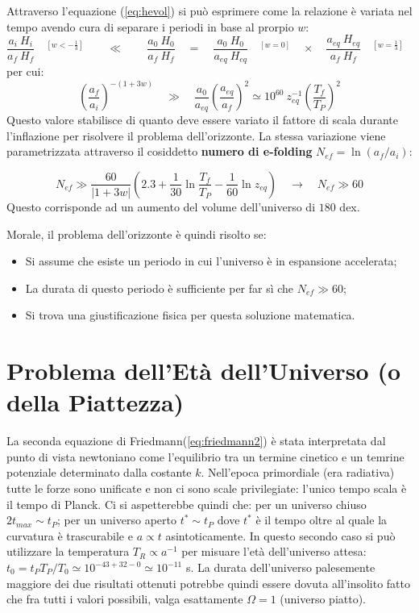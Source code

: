Attraverso l'equazione (\ref{eq:hevol}) si può esprimere come la relazione è variata nel tempo avendo cura di separare i periodi in base al prorpio $w$:
\begin{equation*}
\frac{a_i ~H_i}{a_f ~H_f}\quad ^{[w<- \frac{1}{3}]} \qquad\ll\qquad \frac{a_0 ~H_0}{a_f ~H_f}\quad = \quad\frac{a_0 ~H_0}{a_{eq} ~H_{eq}} \quad ^{[w=0]}\quad \times \quad\frac{a_{eq} ~H_{eq}}{a_f ~H_f} \quad ^{[w= \frac{1}{3}]}\quad
\end{equation*}
per cui:
\begin{equation}
    \left( \frac{a_f}{a_i}\right)^{-(1+3w)} \quad\gg\quad \frac{a_0}{a_{eq}} \left( \frac{a_{eq}}{a_f}\right)^2 \simeq 10^{60} ~z_{eq}^{-1} \left( \frac{T_f}{T_P}\right)^2
\end{equation}
Questo valore stabilisce di quanto deve essere variato il fattore di scala durante l'inflazione per risolvere il problema dell'orizzonte. La stessa variazione viene parametrizzata attraverso il cosiddetto \textbf{numero di e-folding} $N_{ef}=\ln (a_f/a_i)$:

\begin{equation}
    N_{ef} \gg \frac{60}{\left | 1+3w   \right |} \left(  2.3 + \frac{1}{30}\ln\frac{T_f}{T_P}-\frac{1}{60}\ln z_{eq}  \right) \quad \rightarrow \quad  N_{ef} \gg 60
\end{equation}
Questo corrisponde ad un aumento del volume dell'universo di $180$ dex.

\vspace{1em}
\noindent Morale, il problema dell'orizzonte è quindi risolto se:
\begin{itemize}
    \item Si assume che esiste un periodo in cui l'universo è in espansione accelerata;
    \item La durata di questo periodo è sufficiente per far sì che $N_{ef} \gg 60$;
    \item Si trova una giustificazione fisica per questa soluzione matematica.
\end{itemize}

\section{Problema dell'Età dell'Universo (o della Piattezza)}
La seconda equazione di Friedmann(\ref{eq:friedmann2}) è stata interpretata dal punto di vista newtoniano come l'equilibrio tra un termine cinetico e un temrine potenziale determinato dalla costante $k$. Nell'epoca primordiale (era radiativa) tutte le forze sono unificate e non ci sono scale privilegiate: l'unico tempo scala è il tempo di Planck. Ci si aspetterebbe quindi che: per un universo chiuso $2t_{max}\sim t_P$; per un universo aperto $t^* \sim t_P$ dove $t^*$ è il tempo oltre al quale la curvatura è trascurabile e $a\propto t$ asintoticamente. In questo secondo caso si può utilizzare la temperatura $T_R\propto a^{-1}$ per misuare l'età dell'universo attesa: $t_0 = t_P T_P / T_0\simeq 10^{-43+32-0}\simeq 10^{-11}$ s. La durata dell'universo palesemente maggiore dei due risultati ottenuti potrebbe quindi essere dovuta all'insolito fatto che fra tutti i valori possibili, valga esattamente $\Omega=1$ (universo piatto). 

